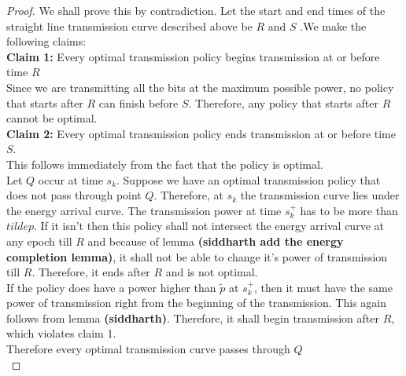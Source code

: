 \begin{proof}
We shall prove this by contradiction. Let the start and end times of the straight line transmission curve described above be $R$ and $S$ .We make the following claims:\\
\textbf{Claim 1:} Every optimal transmission policy begins transmission at or before time $R$\\
Since we are transmitting all the bits at the maximum possible power, no policy that starts after $R$ can finish before $S$. Therefore, any policy that starts after $R$ cannot be optimal.\\
\textbf{Claim 2:} Every optimal transmission policy ends transmission at or before time $S$.\\
This follows immediately from the fact that the policy is optimal. \\
Let $Q$ occur at time $s_k$. Suppose we have an optimal transmission policy that does not pass through point $Q$. Therefore, at $s_k$ the transmission curve lies under the energy arrival curve. The transmission power at time $s_k^+$ has to be more than $tilde{p}$. If it isn't then this policy shall not intersect the energy arrival curve at any epoch till $R$ and because of lemma \textbf{(siddharth add the energy completion lemma)}, it shall not be able to change it's power of transmission till $R$. Therefore, it ends after $R$ and is not optimal.\\
If the policy does have a power higher than $\tilde{p}$ at $s_k^+$, then it must have the same power of transmission right from the beginning of the transmission. This again follows from lemma \textbf{(siddharth)}. Therefore, it shall begin transmission after $R$, which violates claim 1. \\
Therefore every optimal transmission curve passes through $Q$\\
\end{proof}

